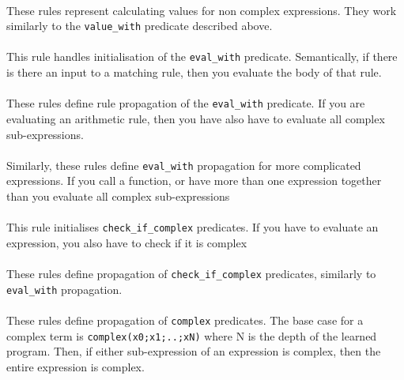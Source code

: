 
\mbox{} \\
These rules represent calculating values for non complex expressions. They work similarly to the \lstinline{value_with} predicate described above.\\ %


\mbox{} \\
This rule handles initialisation of the \lstinline{eval_with} predicate. Semantically, if there is there an input to a matching rule, then you evaluate the body of that rule. \\ %


\mbox{} \\
These rules define rule propagation of the \lstinline{eval_with} predicate. If you are evaluating an arithmetic rule, then you have also have to evaluate all complex sub-expressions. \\ %


\mbox{} \\
Similarly, these rules define \lstinline{eval_with} propagation for more complicated expressions. If you call a function, or have more than one expression together than you evaluate all complex sub-expressions \\ %


\mbox{} \\
This rule initialises \lstinline{check_if_complex} predicates. If you have to evaluate an expression, you also have to check if it is complex \\%


\mbox{} \\
These rules define propagation of \lstinline{check_if_complex} predicates, similarly to \lstinline{eval_with} propagation. \\


\mbox{} \\
These rules define propagation of \lstinline{complex} predicates. The base case for a complex term is \lstinline{complex(x0;x1;..;xN)} where N is the depth of the learned program. Then, if either sub-expression of an expression is complex, then the entire expression is complex. \\

